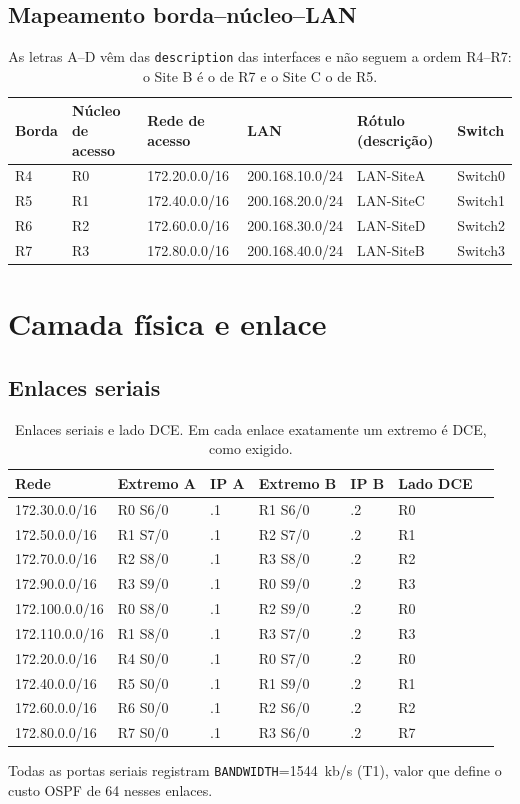 \documentclass[12pt,a4paper]{article}
\begin{document}
\subsection{Mapeamento borda--núcleo--LAN}
\begin{table}[H]\centering\small
\begin{tabular}{@{}llllll@{}}\toprule
Borda & Núcleo de acesso & Rede de acesso & LAN & Rótulo (descrição) & Switch\\\midrule
R4 & R0 & 172.20.0.0/16 & 200.168.10.0/24 & LAN-SiteA & Switch0\\
R5 & R1 & 172.40.0.0/16 & 200.168.20.0/24 & LAN-SiteC & Switch1\\
R6 & R2 & 172.60.0.0/16 & 200.168.30.0/24 & LAN-SiteD & Switch2\\
R7 & R3 & 172.80.0.0/16 & 200.168.40.0/24 & LAN-SiteB & Switch3\\\bottomrule
\end{tabular}
\caption{As letras A--D vêm das \texttt{description} das interfaces e não seguem a ordem R4--R7: o Site B é o de R7 e o Site C o de R5.}
\end{table}

\section{Camada física e enlace}
\subsection{Enlaces seriais}
\begin{table}[H]\centering\small
\begin{tabular}{@{}lllllll@{}}\toprule
Rede & Extremo A & IP A & Extremo B & IP B & Lado DCE\\\midrule
172.30.0.0/16 & R0 S6/0 & .1 & R1 S6/0 & .2 & R0\\
172.50.0.0/16 & R1 S7/0 & .1 & R2 S7/0 & .2 & R1\\
172.70.0.0/16 & R2 S8/0 & .1 & R3 S8/0 & .2 & R2\\
172.90.0.0/16 & R3 S9/0 & .1 & R0 S9/0 & .2 & R3\\
172.100.0.0/16 & R0 S8/0 & .1 & R2 S9/0 & .2 & R0\\
172.110.0.0/16 & R1 S8/0 & .1 & R3 S7/0 & .2 & R3\\\midrule
172.20.0.0/16 & R4 S0/0 & .1 & R0 S7/0 & .2 & R0\\
172.40.0.0/16 & R5 S0/0 & .1 & R1 S9/0 & .2 & R1\\
172.60.0.0/16 & R6 S0/0 & .1 & R2 S6/0 & .2 & R2\\
172.80.0.0/16 & R7 S0/0 & .1 & R3 S6/0 & .2 & R7\\\bottomrule
\end{tabular}
\caption{Enlaces seriais e lado DCE. Em cada enlace exatamente um extremo é DCE, como exigido.}
\end{table}
Todas as portas seriais registram \texttt{BANDWIDTH}=1544~kb/s (T1), valor que define o custo OSPF de 64 nesses enlaces.
\end{document}
